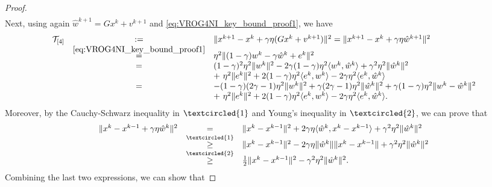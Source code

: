 \documentclass{article}
\newcommand{\norms}[1]{\Vert#1\Vert}
\newcommand{\iprods}[1]{\langle #1\rangle}
\newcommand{\Tc}{\mathcal{T}}
\newcommand{\myeqc}[1]{ {\scriptsize\textcircled{#1}} }
\theoremstyle{plain}
\theoremstyle{definition}
\theoremstyle{remark}
\begin{document}
\begin{proof}
\begin{equation}
\begin{array}{lcl}
\end{array} 
\end{equation}
Next, using again $\hat{w}^{k+1} = Gx^k + v^{k+1}$ and \eqref{eq:VROG4NI_key_bound_proof1}, we have
\begin{equation*} 
\begin{array}{lcl}
\Tc_{[4]} &:= & \norms{x^{k+1} - x^k + \gamma \eta(Gx^k + v^{k+1}) }^2 = \norms{x^{k+1} - x^k + \gamma \eta\hat{w}^{k+1} }^2 \\ 
& \overset{\tiny\eqref{eq:VROG4NI_key_bound_proof1}}{ = } & \eta^2 \norms{(1-\gamma) w^k - \gamma \hat{w}^k + e^k}^2 \\
& = & (1-\gamma)^2 \eta^2 \norms{w^k}^2 - 2\gamma(1-\gamma)\eta^2\iprods{w^k, \hat{w}^k} + \gamma^2\eta^2\norms{\hat{w}^k}^2 \\
&& + {~} \eta^2\norms{e^k}^2 + 2(1-\gamma)\eta^2\iprods{e^k, w^k} - 2\gamma\eta^2\iprods{e^k, \hat{w}^k} \\
& = & -(1-\gamma)(2\gamma-1)\eta^2 \norms{w^k}^2 + \gamma(2\gamma-1)\eta^2\norms{\hat{w}^k}^2 + \gamma(1-\gamma)\eta^2 \norms{w^k - \hat{w}^k}^2 \\
&& + {~} \eta^2\norms{e^k}^2 + 2(1-\gamma)\eta^2\iprods{e^k, w^k} - 2\gamma\eta^2\iprods{e^k, \hat{w}^k}.
\end{array} 
\end{equation*}
Moreover, by the Cauchy-Schwarz inequality in $\myeqc{1}$ and Young's inequality in $\myeqc{2}$, we can prove that
\begin{equation*} 
\begin{array}{lcl}
\norms{x^k - x^{k-1} + \gamma \eta \hat{w}^k }^2 & = & \norms{x^k - x^{k-1}}^2 + 2\gamma\eta\iprods{\hat{w}^k, x^k - x^{k-1}} + \gamma^2\eta^2\norms{\hat{w}^k}^2 \\
& \overset{\myeqc{1}}{ \geq } & \norms{x^k - x^{k-1}}^2 - 2\gamma\eta\norms{\hat{w}^k}\norms{x^k - x^{k-1}} + \gamma^2\eta^2\norms{\hat{w}^k}^2 \\
& \overset{\myeqc{2}}{ \geq } & \frac{1}{2} \norms{x^k - x^{k-1}}^2 - \gamma^2\eta^2 \norms{\hat{w}^k}^2.
\end{array} 
\end{equation*}
Combining the last two expressions, we can show that

\end{proof}
\end{document}
